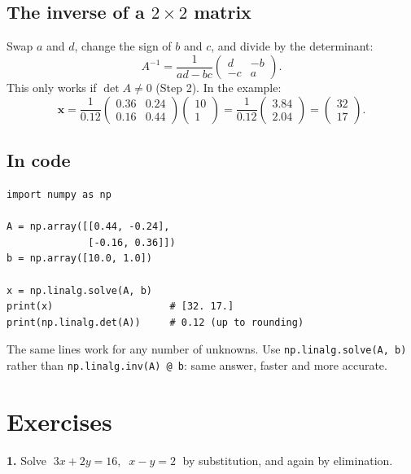 \documentclass[11pt,a4paper]{article}
\begin{document}
\subsection*{The inverse of a $2 \times 2$ matrix}

Swap $a$ and $d$, change the sign of $b$ and $c$, and divide by the determinant:
\[
A^{-1} = \frac{1}{ad - bc} \begin{pmatrix} d & -b\\ -c & a \end{pmatrix}.
\]
This only works if $\det A \neq 0$ (Step 2). In the example:
\[
\mathbf x = \frac{1}{0.12} \begin{pmatrix} 0.36 & 0.24\\ 0.16 & 0.44 \end{pmatrix} \begin{pmatrix} 10\\ 1 \end{pmatrix}
= \frac{1}{0.12} \begin{pmatrix} 3.84\\ 2.04 \end{pmatrix}
= \begin{pmatrix} 32\\ 17 \end{pmatrix}.
\]

\subsection*{In code}

\begin{lstlisting}
import numpy as np

A = np.array([[0.44, -0.24],
              [-0.16, 0.36]])
b = np.array([10.0, 1.0])

x = np.linalg.solve(A, b)
print(x)                    # [32. 17.]
print(np.linalg.det(A))     # 0.12 (up to rounding)
\end{lstlisting}
The same lines work for any number of unknowns. Use \texttt{np.linalg.solve(A, b)} rather than
\texttt{np.linalg.inv(A) @ b}: same answer, faster and more accurate.

\section{Exercises}

\textbf{1.} Solve $\;3x + 2y = 16,\;\; x - y = 2\;$ by substitution, and again by elimination.
\end{document}
